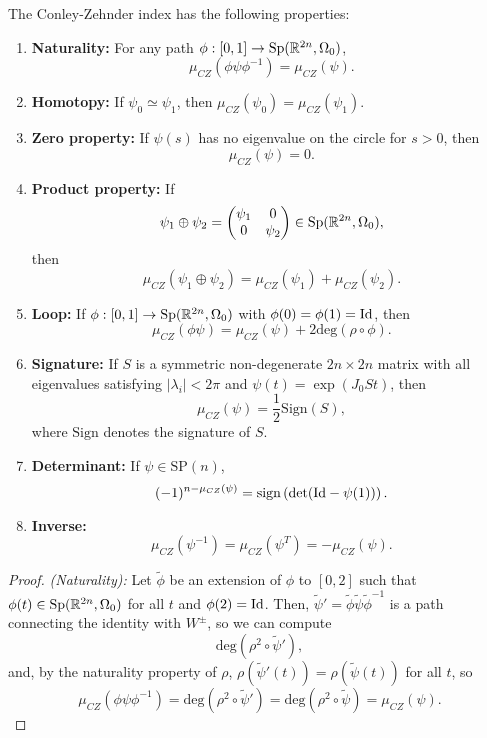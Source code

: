 \begin{prop} \label{conleyzehnderproperties} The Conley-Zehnder index has the following properties:
\begin{enumerate}
	\item {\bf Naturality:} For any path $\phi : [0,1] \rightarrow \text{Sp}(\mathbb{R}^{2n},\Omega_0)$,
	\[\mu_{CZ}(\phi \psi \phi^{-1}) = \mu_{CZ}(\psi) .\]
	\item {\bf Homotopy:} If $\psi_0 \simeq \psi_1$, then $\mu_{CZ}(\psi_0) = \mu_{CZ}(\psi_1)$.
	\item {\bf Zero property:} If $\psi(s)$ has no eigenvalue on the circle for $s > 0$, then
	\[\mu_{CZ}(\psi) = 0 .\]
	\item {\bf Product property:} If
	\[\psi_1 \oplus \psi_2 = \begin{pmatrix} \psi_1 & 0 \\ 0 & \psi_2 \end{pmatrix} \in \text{Sp}(\mathbb{R}^{2n},\Omega_0),\]
	then
	\[\mu_{CZ}(\psi_1 \oplus \psi_2) = \mu_{CZ}(\psi_1) + \mu_{CZ}(\psi_2) .\]
	\item {\bf Loop:} If $\phi : [0,1] \rightarrow \text{Sp}(\mathbb{R}^{2n},\Omega_0)$ with $\phi(0) = \phi(1) = \text{Id}$, then
	\[\mu_{CZ}(\phi \psi) = \mu_{CZ}(\psi) + 2 \text{deg}(\rho \circ \phi) .\]
	\item {\bf Signature:} If $S$ is a symmetric non-degenerate $2n \times 2n$ matrix with all eigenvalues satisfying $|\lambda_i| < 2\pi$ and $\psi(t) = \exp(J_0St)$, then
	\[\mu_{CZ}(\psi) = \frac12 \text{Sign}(S),\]
	where $\text{Sign}$ denotes the signature of $S$.
	\item {\bf Determinant:} If $\psi \in \text{SP}(n)$,
	\[(-1)^{n-\mu_{CZ}(\psi)} = \text{sign} \left( \text{det}(\text{Id} - \psi(1)) \right) .\]
	\item {\bf Inverse:}
	\[\mu_{CZ}(\psi^{-1}) = \mu_{CZ}(\psi^T) = - \mu_{CZ}(\psi) .\]
\end{enumerate}
\end{prop}

\begin{proof} {\it (Naturality):} Let $\widetilde{\phi}$ be an extension of $\phi$ to $[0,2]$ such that $\phi(t) \in \text{Sp}(\mathbb{R}^{2n},\Omega_0)$ for all $t$ and $\phi(2) = \text{Id}$. Then, $\widetilde{\psi}' = \widetilde{\phi} \widetilde{\psi} \widetilde{\phi}^{-1}$ is a path connecting the identity with $W^{\pm}$, so we can compute
\[\text{deg}(\rho^2 \circ \widetilde{\psi}'),\]
and, by the naturality property of $\rho$, $\rho(\widetilde{\psi}'(t)) = \rho(\widetilde{\psi}(t))$ for all $t$, so
\[\mu_{CZ}(\phi\psi\phi^{-1}) = \text{deg}(\rho^2 \circ \widetilde{\psi}') = \text{deg}(\rho^2 \circ \widetilde{\psi}) = \mu_{CZ}(\psi) .\]
\end{proof}

